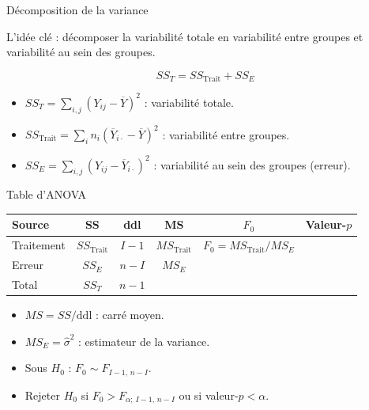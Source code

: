 \documentclass{BeamerTemplate}
\begin{document}
\begin{frame}[t]{Décomposition de la variance}

L'idée clé : décomposer la variabilité totale en variabilité \alert{entre groupes} et variabilité \alert{au sein des groupes}.

\bigskip
$$SS_T = SS_{\text{Trait}} + SS_E$$

\medskip
\begin{itemize}\itemsep4mm
  \item $SS_T = \sum_{i,j}(Y_{ij} - \overline{Y})^2$ : variabilité totale.
  \item $SS_{\text{Trait}} = \sum_i n_i(\overline{Y}_{i\cdot} - \overline{Y})^2$ : variabilité entre groupes.
  \item $SS_E = \sum_{i,j}(Y_{ij} - \overline{Y}_{i\cdot})^2$ : variabilité au sein des groupes (erreur).
\end{itemize}

\end{frame}

\begin{frame}[t]{Table d'ANOVA}

\begin{center}
\begin{tabular}{lccccc}\hline
\textbf{Source} & \textbf{SS} & \textbf{ddl} & \textbf{MS} & \textbf{$F_0$} & \textbf{Valeur-$p$} \\ \hline
Traitement & $SS_{\text{Trait}}$ & $I-1$ & $MS_{\text{Trait}}$ & $F_0 = MS_{\text{Trait}}/MS_E$ & \\[3pt]
Erreur & $SS_E$ & $n-I$ & $MS_E$ & & \\[3pt]
Total & $SS_T$ & $n-1$ & & & \\ \hline
\end{tabular}
\end{center}

\medskip
\begin{itemize}\itemsep3mm
  \item $MS = SS / \text{ddl}$ : carré moyen.
  \item $MS_E = \hat{\sigma}^2$ : estimateur de la variance.
  \item Sous $H_0$ : $F_0 \sim F_{I-1,\,n-I}$.
  \item Rejeter $H_0$ si $F_0 > F_{\alpha;\,I-1,\,n-I}$ ou si valeur-$p < \alpha$.
\end{itemize}

\end{frame}
\end{document}
